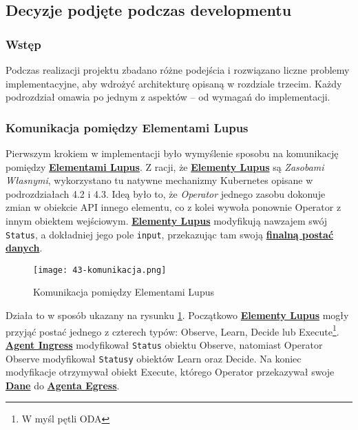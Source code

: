 \subsection{Decyzje podjęte podczas developmentu}

\subsubsection{Wstęp}

Podczas realizacji projektu zbadano różne podejścia i rozwiązano liczne problemy implementacyjne, aby wdrożyć architekturę opisaną w rozdziale trzecim. Każdy podrozdział omawia po jednym z aspektów – od wymagań do implementacji.

\subsubsection{Komunikacja pomiędzy Elementami Lupus}

Pierwszym krokiem w implementacji było wymyślenie sposobu na komunikację pomiędzy \hyperlink{def:element-lupus}{\textbf{Elementami Lupus}}. Z racji, że \hyperlink{def:element-lupus}{\textbf{Elementy Lupus}} są \textit{Zasobami Własnymi}, wykorzystano tu natywne mechanizmy Kubernetes opisane w podrozdziałach 4.2 i 4.3. Ideą było to, że \textit{Operator} jednego zasobu dokonuje zmian w obiekcie API innego elementu, co z kolei wywoła ponownie Operator z innym obiektem wejściowym. \hyperlink{def:element-lupus}{\textbf{Elementy Lupus}} modyfikują nawzajem swój \texttt{Status}, a dokładniej jego pole \texttt{input}, przekazując tam swoją \hyperlink{def:finalne-dane}{\textbf{finalną postać danych}}.

\begin{figure}[!h]
    \centering \texttt{[image: 43-komunikacja.png]}
    \caption{Komunikacja pomiędzy Elementami Lupus}\label{fig:43-komunikacja}
\end{figure}

Działa to w sposób ukazany na rysunku \ref{fig:43-komunikacja}. Początkowo \hyperlink{def:element-lupus}{\textbf{Elementy Lupus}} mogły przyjąć postać jednego z czterech typów: Observe, Learn, Decide lub Execute\footnote{W myśl pętli ODA}. \hyperlink{def:agent-ingress}{\textbf{Agent Ingress}} modyfikował \texttt{Status} obiektu Observe, natomiast Operator Observe modyfikował \texttt{Statusy} obiektów Learn oraz Decide. Na koniec modyfikacje otrzymywał obiekt Execute, którego Operator przekazywał swoje \hyperlink{def:dane}{\textbf{Dane}} do \hyperlink{def:agent-egress}{\textbf{Agenta Egress}}. 

